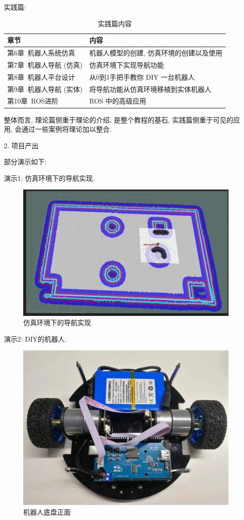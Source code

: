 \documentclass[openany, fontset=windowsold]{ctexbook}
\theoremstyle{kaiti}
\theoremstyle{normal}
\begin{document}
实践篇:

\begin{table}[!h]
  \centering
  \caption{实践篇内容}
  \label{tab:practice_outline}
  \begin{tabular}{ll}
    \hline
    章节 &	内容 \\
    \hline
    第6章~机器人系统仿真 &	机器人模型的创建, 仿真环境的创建以及使用 \\
    第7章~机器人导航 (仿真) &	仿真环境下实现导航功能 \\
    第8章~机器人平台设计 &	从0到1手把手教你 DIY 一台机器人 \\
    第9章~机器人导航 (实体) &	将导航功能从仿真环境移植到实体机器人 \\
    第10章~ROS进阶 &	ROS 中的高级应用 \\
    \hline
  \end{tabular}
\end{table}

整体而言, 理论篇侧重于理论的介绍, 是整个教程的基石, 实践篇侧重于可见的应用, 会通过一些案例将理论加以整合.

2. 项目产出

部分演示如下:

演示1: 仿真环境下的导航实现.

\begin{figure}[!ht]
  \centering
  \includegraphics[width=.7\textwidth]{navigation_demo.png}
  \caption{仿真环境下的导航实现}
  \label{fig:navigation_demo}
\end{figure}

演示2: DIY的机器人.

\begin{figure}[!ht]
  \centering
  \includegraphics[width=.5\textwidth]{robot_chassis_front.jpg}
  \caption{机器人底盘正面}
  \label{fig:robot_chassis_front_}
\end{figure}
\end{document}
